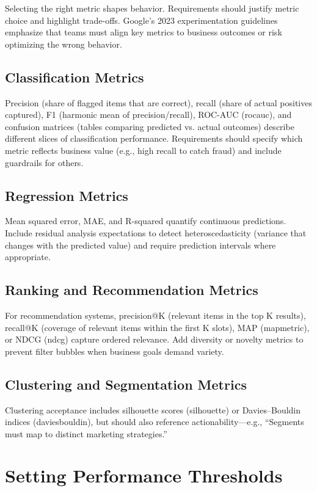 Selecting the right metric shapes behavior. Requirements should justify metric choice and highlight trade-offs. Google’s 2023 experimentation guidelines emphasize that teams must align key metrics to business outcomes or risk optimizing the wrong behavior.

\subsection{Classification Metrics}
Precision (share of flagged items that are correct), recall (share of actual positives captured), F1 (harmonic mean of precision/recall), ROC-AUC (\gls{rocauc}), and confusion matrices (tables comparing predicted vs. actual outcomes) describe different slices of classification performance. Requirements should specify which metric reflects business value (e.g., high recall to catch fraud) and include guardrails for others.

\subsection{Regression Metrics}
Mean squared error, MAE, and R-squared quantify continuous predictions. Include residual analysis expectations to detect heteroscedasticity (variance that changes with the predicted value) and require prediction intervals where appropriate.

\subsection{Ranking and Recommendation Metrics}
For recommendation systems, precision@K (relevant items in the top K results), recall@K (coverage of relevant items within the first K slots), MAP (\gls{mapmetric}), or NDCG (\gls{ndcg}) capture ordered relevance. Add diversity or novelty metrics to prevent filter bubbles when business goals demand variety.

\subsection{Clustering and Segmentation Metrics}
Clustering acceptance includes silhouette scores (\gls{silhouette}) or Davies--Bouldin indices (\gls{daviesbouldin}), but should also reference actionability---e.g., ``Segments must map to distinct marketing strategies.''

\section{Setting Performance Thresholds}
\label{sec:performance-thresholds}

